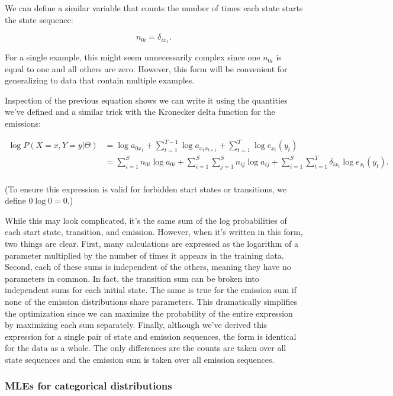 We can define a similar variable that counts the number of times each state starts the state sequence:

\begin{equation*}
n_{0i} = \delta_{ix_1}.
\end{equation*}

For a single example, this might seem unnecessarily complex since one $n_{0i}$ is equal to one and all others are zero. However, this form will be convenient for generalizing to data that contain multiple examples.

Inspection of the previous equation shows we can write it using the quantities we've defined and a similar trick with the Kronecker delta function for the emissions:

\begin{align*}
\log P(X=x, Y=y|\Theta)
&= \log a_{0x_1}+ \sum_{t=1}^{T-1} \log a_{x_t x_{t+1}} + \sum_{t=1}^T \log e_{x_t}(y_t) \\
&= \sum_{i=1}^S n_{0i} \log a_{0i} +
   \sum_{i=1}^S \sum_{j=1}^S n_{ij} \log a_{ij} +
   \sum_{i=1}^S \sum_{t=1}^T \delta_{ix_t} \log e_{x_t}(y_t). \\
\end{align*}

(To ensure this expression is valid for forbidden start states or transitions, we define $0 \log0 = 0$.)

While this may look complicated, it's the same sum of the log probabilities of each start state, transition, and emission. However, when it's written in this form, two things are clear. First, many calculations are expressed as the logarithm of a parameter multiplied by the number of times it appears in the training data. Second, each of these sums is independent of the others, meaning they have no parameters in common. In fact, the transition sum can be broken into independent sums for each initial state. The same is true for the emission sum if none of the emission distributions share parameters. This dramatically simplifies the optimization since we can maximize the probability of the entire expression by maximizing each sum separately. Finally, although we've derived this expression for a single pair of state and emission sequences, the form is identical for the data as a whole. The only differences are the counts are taken over all state sequences and the emission sum is taken over all emission sequences.

\subsubsection{MLEs for categorical distributions}


